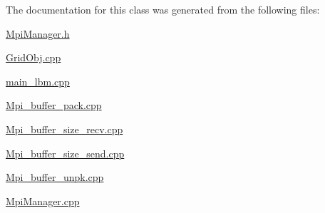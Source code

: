 The documentation for this class was generated from the following files\+:\begin{DoxyCompactItemize}
\item 
\hyperlink{_mpi_manager_8h}{Mpi\+Manager.\+h}\item 
\hyperlink{_grid_obj_8cpp}{Grid\+Obj.\+cpp}\item 
\hyperlink{main__lbm_8cpp}{main\+\_\+lbm.\+cpp}\item 
\hyperlink{_mpi__buffer__pack_8cpp}{Mpi\+\_\+buffer\+\_\+pack.\+cpp}\item 
\hyperlink{_mpi__buffer__size__recv_8cpp}{Mpi\+\_\+buffer\+\_\+size\+\_\+recv.\+cpp}\item 
\hyperlink{_mpi__buffer__size__send_8cpp}{Mpi\+\_\+buffer\+\_\+size\+\_\+send.\+cpp}\item 
\hyperlink{_mpi__buffer__unpk_8cpp}{Mpi\+\_\+buffer\+\_\+unpk.\+cpp}\item 
\hyperlink{_mpi_manager_8cpp}{Mpi\+Manager.\+cpp}\end{DoxyCompactItemize}
